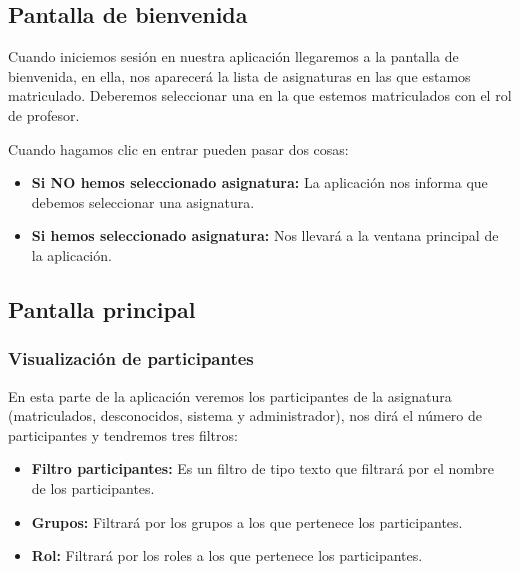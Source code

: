 \subsection{Pantalla de bienvenida}


Cuando iniciemos sesión en nuestra aplicación llegaremos a la pantalla de bienvenida, en ella, nos aparecerá la lista de asignaturas en las que estamos matriculado. Deberemos seleccionar una en la que estemos matriculados con el rol de profesor.


Cuando hagamos clic en entrar pueden pasar dos cosas:

\begin{itemize}
	\tightlist
	\item
	\textbf{Si NO hemos seleccionado asignatura:} La aplicación nos informa que debemos seleccionar una asignatura.
	\item
	\textbf{Si hemos seleccionado asignatura:} Nos llevará a la ventana principal de la aplicación.
	
\end{itemize}

\subsection{Pantalla principal}


\subsubsection{Visualización de participantes}

En esta parte de la aplicación veremos los participantes de la asignatura (matriculados, desconocidos, sistema y administrador), nos dirá el número de participantes y tendremos tres filtros:


\begin{itemize}
	\tightlist
	\item
	\textbf{Filtro participantes:} Es un filtro de tipo texto que filtrará por el nombre de los participantes.
	\item
	\textbf{Grupos:} Filtrará por los grupos a los que pertenece los participantes.
	\item
	\textbf{Rol:} Filtrará por los roles a los que pertenece los participantes.
	
\end{itemize}


